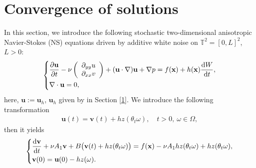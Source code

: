 \documentclass{elsarticle}
\theoremstyle{definition}
\numberwithin{equation}{section}
\renewcommand{\d}{{\rm{d}}}
\begin{document}
\section{Convergence of solutions}\label{sec8}

In this section, we introduce the following stochastic two-dimensional anisotropic Navier-Stokes (NS) equations driven by additive white noise  on  $\mathbb{T}^2=[0,L]^2$, $L>0$:
 \begin{align} \label{8.1}
 \left \{
  \begin{aligned}
 &  \frac{\partial \textbf{u}}{\partial t}-  \nu \left(
\begin{array}{ccc}
\partial_{yy}u\\ \partial_{xx}v
\end{array}\right)+(\textbf{u}\cdot\nabla)\textbf{u}+\nabla p=  f(\textbf{x}) +h(\textbf{x})\frac{\d W}{\d t},\\
  & \nabla\cdot \textbf{u}=0,
  \end{aligned} \right.
\end{align}
here, $\textbf{u}:=\textbf{u}_{h}$, $\textbf{u}_{h}$ given by in Section \ref{1}. We introduce the following transformation
 \begin{align*}
\textbf{u}(t)=\textbf{v}(t)+hz(\theta_t\omega),\quad t>0,\ \omega\in \Omega,
\end{align*}
then it yields
\begin{align}\label{8.5}
\left\{
\begin{aligned}
&
\frac{\d \textbf{v}}{\d t}+ \nu A_1\textbf{v}+B\big( \textbf{v}(t)+hz(\theta_t\omega)\big)=f(\textbf{x})-  \nu A_1hz(\theta_t\omega)+hz(\theta_t\omega), \\
& \textbf{v}(0)=\textbf{u}(0)-hz (\omega).
\end{aligned}
\right.
\end{align}
\end{document}
